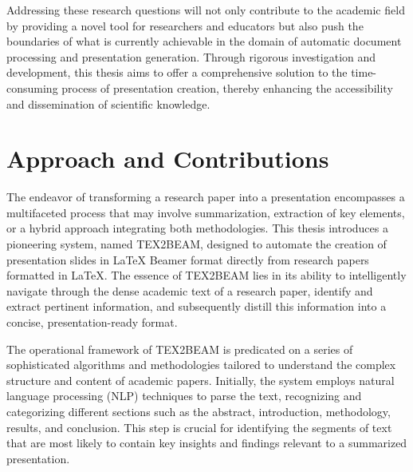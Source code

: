 Addressing these research questions will not only contribute to the academic field by providing a novel tool for researchers and educators but also push the boundaries of what is currently achievable in the domain of automatic document processing and presentation generation. Through rigorous investigation and development, this thesis aims to offer a comprehensive solution to the time-consuming process of presentation creation, thereby enhancing the accessibility and dissemination of scientific knowledge.

\section{Approach and Contributions}
\label{sec:intro:approach}


The endeavor of transforming a research paper into a presentation encompasses a multifaceted process that may involve summarization, extraction of key elements, or a hybrid approach integrating both methodologies. This thesis introduces a pioneering system, named TEX2BEAM, designed to automate the creation of presentation slides in \LaTeX{} Beamer format directly from research papers formatted in \LaTeX{}. The essence of TEX2BEAM lies in its ability to intelligently navigate through the dense academic text of a research paper, identify and extract pertinent information, and subsequently distill this information into a concise, presentation-ready format.

The operational framework of TEX2BEAM is predicated on a series of sophisticated algorithms and methodologies tailored to understand the complex structure and content of academic papers. Initially, the system employs natural language processing (NLP) techniques to parse the text, recognizing and categorizing different sections such as the abstract, introduction, methodology, results, and conclusion. This step is crucial for identifying the segments of text that are most likely to contain key insights and findings relevant to a summarized presentation.

